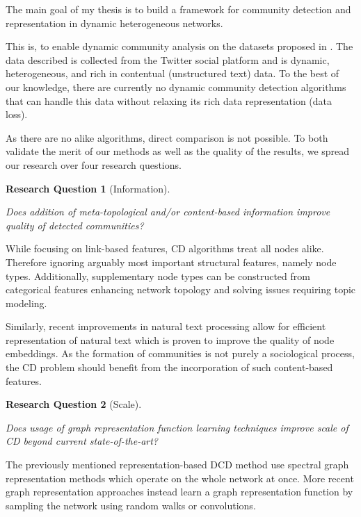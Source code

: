 \documentclass[
acmsmall,
nonacm,
screen,
acmthm]{../../scripts/pandoc/templates/acmart}
\newtheorem{rqq}{Research Question}
\begin{document}
The main goal of my thesis is to build a framework for community
detection and representation in dynamic heterogeneous networks.

This is, to enable dynamic community analysis on the datasets proposed
in \citet{wangPublicSentimentGovernmental2020}. The data described is
collected from the Twitter social platform and is dynamic,
heterogeneous, and rich in contentual (unstructured text) data. To the
best of our knowledge, there are currently no dynamic community
detection algorithms that can handle this data without relaxing its rich
data representation (data loss).

As there are no alike algorithms, direct comparison is not possible. To
both validate the merit of our methods as well as the quality of the
results, we spread our research over four research questions.

\begin{rqq}[Information]\label{rqq:rq1} 

\emph{Does addition of meta-topological and/or content-based information
improve quality of detected communities?}

\end{rqq}

While focusing on link-based features, CD algorithms treat all nodes
alike. Therefore ignoring arguably most important structural features,
namely node types. Additionally, supplementary node types can be
constructed from categorical features enhancing network topology and
solving issues requiring topic modeling.

Similarly, recent improvements in natural text processing allow for
efficient representation of natural text which is proven to improve the
quality of node embeddings. As the formation of communities is not
purely a sociological process, the CD problem should benefit from the
incorporation of such content-based features.

\begin{rqq}[Scale]\label{rqq:rq2} 

\emph{Does usage of graph representation function learning techniques
improve scale of CD beyond current state-of-the-art?}

\end{rqq}

The previously mentioned representation-based DCD method use spectral
graph representation methods which operate on the whole network at once.
More recent graph representation approaches instead learn a graph
representation function by sampling the network using random walks or
convolutions.
\end{document}
